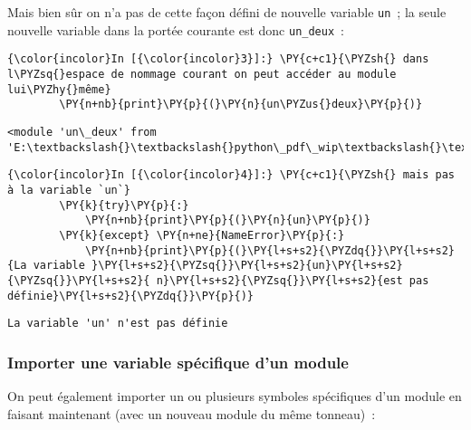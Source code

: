     Mais bien sûr on n'a pas de cette façon défini de nouvelle variable
\texttt{un}~; la seule nouvelle variable dans la portée courante est
donc \texttt{un\_deux}~:

    \begin{Verbatim}[commandchars=\\\{\}]
{\color{incolor}In [{\color{incolor}3}]:} \PY{c+c1}{\PYZsh{} dans l\PYZsq{}espace de nommage courant on peut accéder au module lui\PYZhy{}même}
        \PY{n+nb}{print}\PY{p}{(}\PY{n}{un\PYZus{}deux}\PY{p}{)}
\end{Verbatim}


    \begin{Verbatim}[commandchars=\\\{\}]
<module 'un\_deux' from 'E:\textbackslash{}\textbackslash{}python\_pdf\_wip\textbackslash{}\textbackslash{}flotpython\textbackslash{}\textbackslash{}w5\textbackslash{}\textbackslash{}un\_deux.py'>

    \end{Verbatim}

    \begin{Verbatim}[commandchars=\\\{\}]
{\color{incolor}In [{\color{incolor}4}]:} \PY{c+c1}{\PYZsh{} mais pas à la variable `un`}
        \PY{k}{try}\PY{p}{:}
            \PY{n+nb}{print}\PY{p}{(}\PY{n}{un}\PY{p}{)}
        \PY{k}{except} \PY{n+ne}{NameError}\PY{p}{:} 
            \PY{n+nb}{print}\PY{p}{(}\PY{l+s+s2}{\PYZdq{}}\PY{l+s+s2}{La variable }\PY{l+s+s2}{\PYZsq{}}\PY{l+s+s2}{un}\PY{l+s+s2}{\PYZsq{}}\PY{l+s+s2}{ n}\PY{l+s+s2}{\PYZsq{}}\PY{l+s+s2}{est pas définie}\PY{l+s+s2}{\PYZdq{}}\PY{p}{)}
\end{Verbatim}


    \begin{Verbatim}[commandchars=\\\{\}]
La variable 'un' n'est pas définie

    \end{Verbatim}

    \hypertarget{importer-une-variable-spuxe9cifique-dun-module}{%
\subsubsection{Importer une variable spécifique d'un
module}\label{importer-une-variable-spuxe9cifique-dun-module}}

    On peut également importer un ou plusieurs symboles spécifiques d'un
module en faisant maintenant (avec un nouveau module du même tonneau)~:

